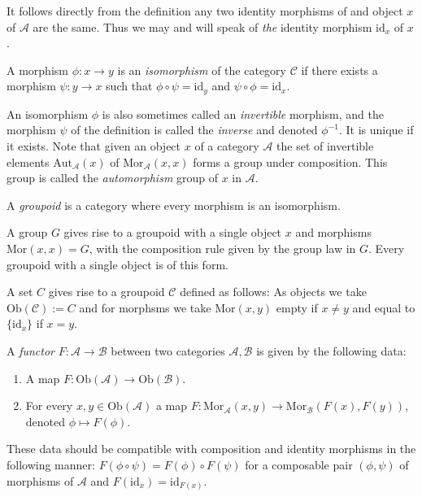 \begin{remark}
\label{remark-unique-indentity}
It follows directly from the definition any two identity morphisms
of and object $x$ of $\mathcal{A}$ are the same. Thus we may and will
speak of {\it the} identity morphism $\text{id}_x$ of $x$.
\end{remark}

\begin{definition}
\label{definition-isomorphism}
A morphism $\phi : x \to y$ is an {\it isomorphism} of the category
$\mathcal{C}$ if there exists a morphism $\psi : y \to x$
such that $\phi \circ \psi = \text{id}_y$ and
$\psi \circ \phi = \text{id}_x$.
\end{definition}

\noindent
An isomorphism $\phi$ is also sometimes called an {\it invertible}
morphism, and the morphism $\psi$ of the definition is called the
{\it inverse} and denoted $\phi^{-1}$. It is unique if it exists. Note that
given an object $x$ of a category $\mathcal{A}$ the set of invertible
elements $\text{Aut}_{\mathcal{A}}(x)$
of $\text{Mor}_{\mathcal{A}}(x, x)$ forms a group under composition.
This group is called the {\it automorphism} group of $x$ in $\mathcal{A}$.

\begin{definition}
\label{definition-groupoid}
A {\it groupoid} is a category where every morphism is an isomorphism.
\end{definition}

\begin{example}
\label{example-group-groupoid}
A group $G$ gives rise to a groupoid with a single object $x$
and morphisms $\text{Mor}(x, x) = G$, with the composition rule
given by the group law in $G$. Every groupoid with a single
object is of this form.
\end{example}

\begin{example}
\label{example-set-groupoid}
A set $C$ gives rise to a groupoid $\mathcal{C}$ defined as follows:
As objects we take $\text{Ob}(\mathcal{C}) := C$ and for morphsms
we take $\text{Mor}(x, y)$ empty if $x\neq y$ and equal to
$\{\text{id}_x\}$ if $x = y$.
\end{example}

\begin{definition}
\label{definition-functor}
A {\it functor} $F : \mathcal{A} \to \mathcal{B}$
between two categories $\mathcal{A}, \mathcal{B}$ is given by the
following data:
\begin{enumerate}
\item A map $F : \text{Ob}(\mathcal{A}) \to \text{Ob}(\mathcal{B})$.
\item For every $x, y \in \text{Ob}(\mathcal{A})$ a map
$F : \text{Mor}_\mathcal{A}(x, y) \to \text{Mor}_\mathcal{B}(F(x), F(y))$,
denoted $\phi \mapsto F(\phi)$.
\end{enumerate}
These data should be compatible with composition and identity morphisms
in the following manner: $F(\phi \circ \psi) =
F(\phi) \circ F(\psi)$ for a composable pair $(\phi, \psi)$ of
morphisms of $\mathcal{A}$ and $F(\text{id}_x) = \text{id}_{F(x)}$.
\end{definition}

